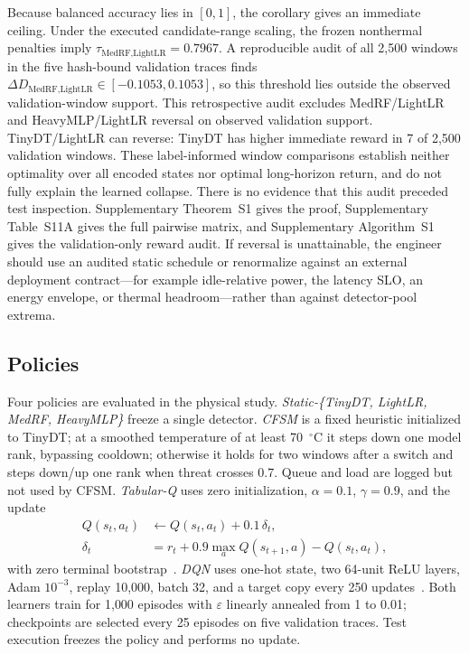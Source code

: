 Because balanced accuracy lies in $[0,1]$, the corollary gives an immediate ceiling. Under the executed candidate-range scaling, the frozen nonthermal penalties imply $\tau_{\text{MedRF},\text{LightLR}}=0.7967$. A reproducible audit of all 2{,}500 windows in the five hash-bound validation traces finds $\Delta D_{\text{MedRF},\text{LightLR}}\in[-0.1053,0.1053]$, so this threshold lies outside the observed validation-window support. This retrospective audit excludes MedRF/LightLR and HeavyMLP/LightLR reversal on observed validation support. TinyDT/LightLR can reverse: TinyDT has higher immediate reward in 7 of 2{,}500 validation windows. These label-informed window comparisons establish neither optimality over all encoded states nor optimal long-horizon return, and do not fully explain the learned collapse. There is no evidence that this audit preceded test inspection. Supplementary Theorem~S1 gives the proof, Supplementary Table~S11A gives the full pairwise matrix, and Supplementary Algorithm~S1 gives the validation-only reward audit. If reversal is unattainable, the engineer should use an audited static schedule or renormalize against an external deployment contract---for example idle-relative power, the latency SLO, an energy envelope, or thermal headroom---rather than against detector-pool extrema.

\subsection{Policies}
Four policies are evaluated in the physical study. \emph{Static-\{TinyDT, LightLR, MedRF, HeavyMLP\}} freeze a single detector. \emph{CFSM} is a fixed heuristic initialized to TinyDT; at a smoothed temperature of at least 70~$^{\circ}$C it steps down one model rank, bypassing cooldown; otherwise it holds for two windows after a switch and steps down/up one rank when threat crosses 0.7. Queue and load are logged but not used by CFSM. \emph{Tabular-Q} uses zero initialization, $\alpha=0.1$, $\gamma=0.9$, and the update
\begin{equation}
    \begin{aligned}
        Q(s_t,a_t) &\leftarrow Q(s_t,a_t) + 0.1\,\delta_t,\\
        \delta_t &= r_t + 0.9\max_a Q(s_{t+1},a) - Q(s_t,a_t),
    \end{aligned}
\end{equation}
with zero terminal bootstrap~\cite{Watkins1992}. \emph{DQN} uses one-hot state, two 64-unit ReLU layers, Adam $10^{-3}$, replay 10{,}000, batch 32, and a target copy every 250 updates~\cite{Mnih2015}. Both learners train for 1{,}000 episodes with $\varepsilon$ linearly annealed from 1 to 0.01; checkpoints are selected every 25 episodes on five validation traces. Test execution freezes the policy and performs no update.

